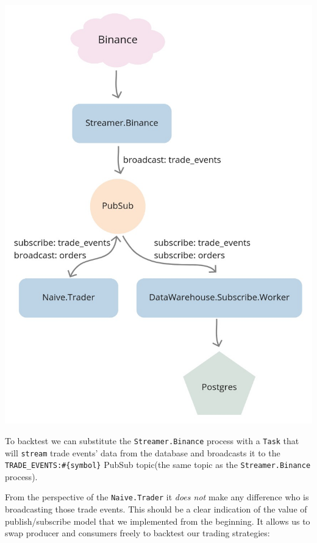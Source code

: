 \documentclass[
  oneside]{book}
\begin{document}
\begin{center}\includegraphics[width=1\linewidth,height=0.6\textheight]{images/chapter_14_02_current_pubsub} \end{center}

\newpage

To backtest we can substitute the \texttt{Streamer.Binance} process with a \texttt{Task} that will \texttt{stream} trade events' data from the database and broadcasts it to the \texttt{TRADE\_EVENTS:\#\{symbol\}} PubSub topic(the same topic as the \texttt{Streamer.Binance} process).

From the perspective of the \texttt{Naive.Trader} it \emph{does not} make any difference who is broadcasting those trade events. This should be a clear indication of the value of publish/subscribe model that we implemented from the beginning. It allows us to swap producer and consumers freely to backtest our trading strategies:
\end{document}

